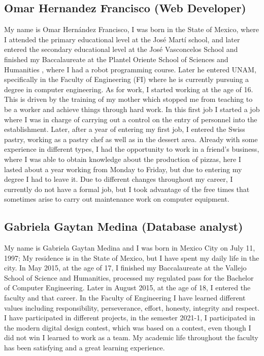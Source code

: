 \documentclass{article}
\begin{document}
\subsection{Omar Hernandez Francisco (Web Developer)}
My name is Omar Hernández Francisco, I was born in the State of Mexico, where I attended the primary educational level at the José Martí school, and later entered the secondary educational level at the José Vasconcelos School and finished my Baccalaureate at the Plantel Oriente School of Sciences and Humanities , where I had a robot programming course.
Later he entered UNAM, specifically in the Faculty of Engineering (FI) where he is currently pursuing a degree in computer engineering.
As for work, I started working at the age of 16. This is driven by the training of my mother which stopped me from teaching to be a worker and achieve things through hard work. In this first job I started a job where I was in charge of carrying out a control on the entry of personnel into the establishment. Later, after a year of entering my first job, I entered the Swiss pastry, working as a pastry chef as well as in the dessert area. Already with some experience in different types, I had the opportunity to work in a friend's business, where I was able to obtain knowledge about the production of pizzas, here I lasted about a year working from Monday to Friday, but due to entering my degree I had to leave it.
Due to different changes throughout my career, I currently do not have a formal job, but I took advantage of the free times that sometimes arise to carry out maintenance work on computer equipment.
\subsection{Gabriela Gaytan Medina (Database analyst)}
My name is Gabriela Gaytan Medina and I was born in Mexico City on July 11, 1997; My residence is in the State of Mexico, but I have spent my daily life in the city.
In May 2015, at the age of 17, I finished my Baccalaureate at the Vallejo School of Science and Humanities, processed my regulated pass for the Bachelor of Computer Engineering. Later in August 2015, at the age of 18, I entered the faculty and that career.
In the Faculty of Engineering I have learned different values including responsibility, perseverance, effort, honesty, integrity and respect.
I have participated in different projects, in the semester 2021-1, I participated in the modern digital design contest, which was based on a contest, even though I did not win I learned to work as a team.
My academic life throughout the faculty has been satisfying and a great learning experience.
\end{document}
